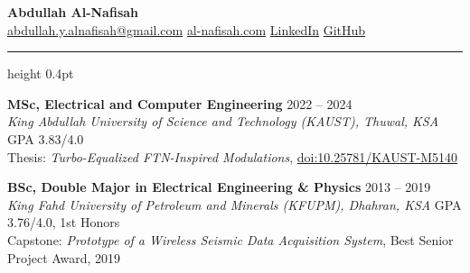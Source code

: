 \documentclass[a4paper,10pt]{article}
\newcommand{\divider}{\par\vspace{2.2mm}\hrule height 0.4pt\vspace{1.6mm}\par\noindent}
\begin{document}
\begin{center}
    \Huge{\textbf{Abdullah Al-Nafisah}}\\
    \vspace{0.7mm}
    \normalsize
    \href{mailto:abdullah.y.alnafisah@gmail.com}{abdullah.y.alnafisah@gmail.com} \textbar{} \href{https://al-nafisah.com}{al-nafisah.com} \textbar{} \href{https://www.linkedin.com/in/abdullah-al-nafisah/}{LinkedIn} \textbar{} \href{https://github.com/AbdullahAlNafisah}{GitHub}
\end{center}




\divider
\noindent %
\textbf{MSc, Electrical and Computer Engineering} \hfill 2022 -- 2024\\
\textit{King Abdullah University of Science and Technology (KAUST), Thuwal, KSA} \textbar{} GPA 3.83/4.0\\
Thesis: \textit{Turbo-Equalized FTN-Inspired Modulations}, \href{https://doi.org/10.25781/KAUST-M5140}{doi:10.25781/KAUST-M5140}

\vspace{0.7mm} %
\textbf{BSc, Double Major in Electrical Engineering \& Physics} \hfill 2013 -- 2019\\
\textit{King Fahd University of Petroleum and Minerals (KFUPM), Dhahran, KSA} \textbar{} GPA 3.76/4.0, 1st Honors\\
Capstone: \textit{Prototype of a Wireless Seismic Data Acquisition System}, Best Senior Project Award, 2019
\end{document}
